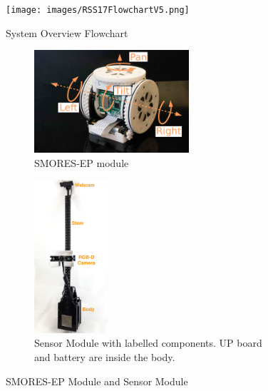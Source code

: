 \documentclass[12pt]{article}
\begin{document}
\begin{figure}[H]
\begin{center}
\texttt{[image: images/RSS17FlowchartV5.png]}
\caption{System Overview Flowchart}
\label{fig:overview}
\end{center}
\end{figure}

\begin{figure}[H]
  \begin{subfigure}{0.5\columnwidth}
  \begin{center}
  \includegraphics[height=1.5in]{images/smores_dof.pdf}
  \end{center}
  \caption{SMORES-EP module}
  \label{fig:smores-module}
  \end{subfigure}
  \begin{subfigure}{0.5\columnwidth}
  \begin{center}
  \includegraphics[width=0.3\textwidth]{images/sensor_module_new_labelled.jpg}
  \caption{Sensor Module with labelled components.  UP board and battery are inside the body.}
  \label{fig:sensor-module}
  \end{center}
  \end{subfigure}
  \caption{SMORES-EP Module and Sensor Module}
\end{figure}
\end{document}
